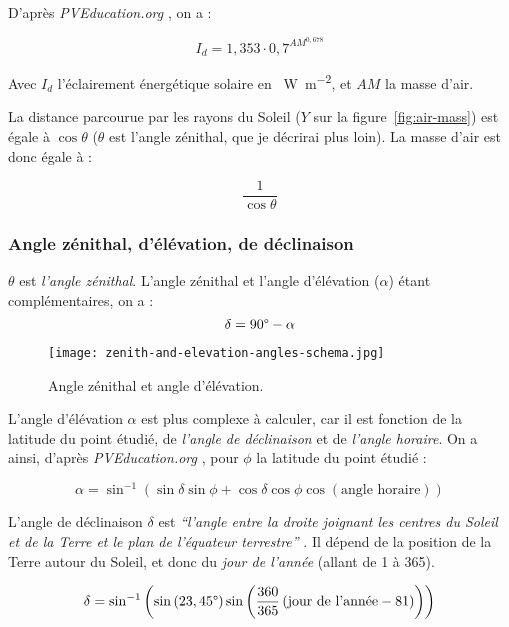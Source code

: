 \documentclass[12pt]{article}
\begin{document}
D'après \emph{PVEducation.org} \cite{pos_air_mass}, on a :

\[
	I_d = 1,353 \cdot 0,7^{{AM}^{0,678}}
\]

Avec $I_d$ l'éclairement énergétique solaire en \SI{}{\watt\per\square\meter}, et $AM$ la masse d'air.

La distance parcourue par les rayons du Soleil ($Y$ sur la figure~\ref{fig:air-mass}) est égale à $\cos \theta$ ($\theta$ est l'angle zénithal, que je décrirai plus loin).
La masse d'air est donc égale à :

\[\frac{1 }{\cos \theta}\]

\subsubsection{Angle zénithal, d'élévation, de déclinaison}
$\theta$ est \emph{l'angle zénithal}. L'angle zénithal et l'angle d'élévation ($\alpha$) étant complémentaires, on a :
\[
	\delta = 90\degree - \alpha
\]


 \begin{figure}[H]
	\centerline{\texttt{[image: zenith-and-elevation-angles-schema.jpg]}}
	\caption{Angle zénithal et angle d'élévation.}
	\label{fig:elevation-and-zenith-angle}
\end{figure}

L'angle d'élévation $\alpha$ est plus complexe à calculer, car il est fonction de la latitude du point étudié, de \emph{l'angle de déclinaison} et de \emph{l'angle horaire}. On a ainsi, d'après \emph{PVEducation.org} \cite{pos_elevation_angle}, pour $\phi$ la latitude du point étudié :

\[
	\alpha = \sin^{-1} \left(
		\sin \delta \sin \phi +
		\cos \delta \cos \phi \cos \left( \text{angle horaire} \right)
	\right)
\]

L'angle de déclinaison $\delta$ est \emph{``l'angle entre la droite joignant les centres du Soleil et de la Terre et le plan de l'équateur terrestre''} \cite{mouvement_terre}. Il dépend de la position de la Terre autour du Soleil, et donc du \emph{jour de l'année} (allant de 1 à 365).

\[
	\delta = \sin^{-1} \left(
		\sin \left( 23,45\degree \right)
		\sin \left(
			\frac{360}{365}
			\left(
				\text{jour de l'année} - 81
			\right)
		\right)
	\right)
\]
\end{document}
